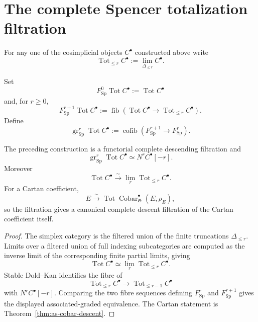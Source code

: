 \section{The complete Spencer totalization filtration}
\label{sec:as-spencer-filtration}

For any one of the cosimplicial objects $C^\bullet$ constructed above write
\[
    \operatorname{Tot}_{\leq r}C^\bullet
    :=
    \lim_{\Delta_{\leq r}}C^\bullet.
\]

\begin{definition}
\label{def:as-partial-totalization}
Set
\[
    F_{\mathrm{Sp}}^0\operatorname{Tot}C^\bullet
    :=
    \operatorname{Tot}C^\bullet
\]
and, for $r\geq0$,
\[
\boxed{
    F_{\mathrm{Sp}}^{r+1}\operatorname{Tot}C^\bullet
    :=
    \operatorname{fib}
    \left(
        \operatorname{Tot}C^\bullet
        \longrightarrow
        \operatorname{Tot}_{\leq r}C^\bullet
    \right).
}
\]
Define
\[
    \operatorname{gr}_{\mathrm{Sp}}^r
    \operatorname{Tot}C^\bullet
    :=
    \operatorname{cofib}
    \left(
        F_{\mathrm{Sp}}^{r+1}
        \longrightarrow
        F_{\mathrm{Sp}}^{r}
    \right).
\]
\end{definition}

\begin{theorem}
\label{thm:as-complete-spencer-filtration}
The preceding construction is a functorial complete descending filtration and
\[
\boxed{
    \operatorname{gr}_{\mathrm{Sp}}^{r}
    \operatorname{Tot}C^\bullet
    \simeq
    N^rC^\bullet[-r].
}
\]
Moreover
\[
    \operatorname{Tot}C^\bullet
    \xrightarrow{\sim}
    \lim_r\operatorname{Tot}_{\leq r}C^\bullet.
\]
For a Cartan coefficient,
\[
    E
    \xrightarrow{\sim}
    \operatorname{Tot}
    \operatorname{Cobar}_{\mathfrak G}^{\bullet}(E,\rho_E),
\]
so the filtration gives a canonical complete descent filtration of the
Cartan coefficient itself.
\end{theorem}

\begin{proof}
The simplex category is the filtered union of the finite truncations
$\Delta_{\leq r}$.  Limits over a filtered union of full indexing
subcategories are computed as the inverse limit of the corresponding finite
partial limits, giving
\[
    \operatorname{Tot}C^\bullet
    \simeq
    \lim_r\operatorname{Tot}_{\leq r}C^\bullet.
\]
Stable Dold--Kan identifies the fibre of
\[
    \operatorname{Tot}_{\leq r}C^\bullet
    \longrightarrow
    \operatorname{Tot}_{\leq r-1}C^\bullet
\]
with $N^rC^\bullet[-r]$.  Comparing the two fibre sequences defining
$F_{\mathrm{Sp}}^r$ and $F_{\mathrm{Sp}}^{r+1}$ gives the displayed
associated-graded equivalence.  The Cartan statement is
Theorem~\ref{thm:as-cobar-descent}.
\end{proof}

